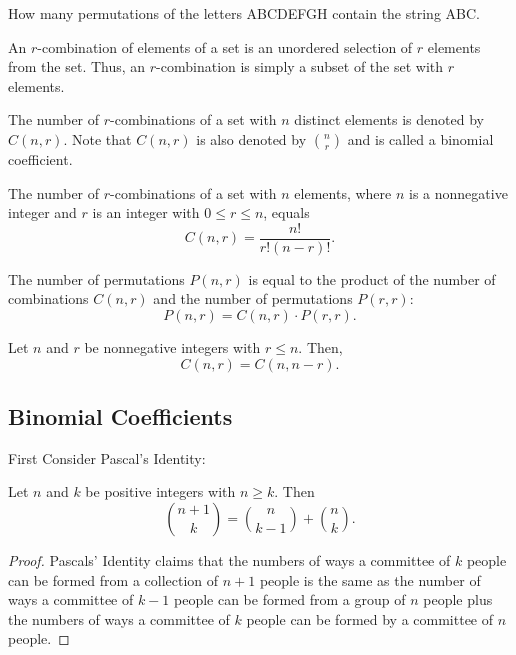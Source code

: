 \begin{exmp}

How many permutations of the letters ABCDEFGH contain the string ABC.
\vspace{3cm}
\end{exmp}
\begin{defn}
    An $r$-combination of elements of a set is an unordered selection of $r$ elements from the set. Thus, an $r$-combination is simply a subset of the set with $r$ elements.
\end{defn}
\begin{defn}
    The number of $r$-combinations of a set with $n$ distinct elements is denoted by $C(n, r)$. Note that $C(n, r)$ is also denoted by $\binom{n}{r}$ and is called a binomial coefficient.
\end{defn}
\begin{thm}
    The number of $r$-combinations of a set with $n$ elements, where $n$ is a nonnegative integer and $r$ is an integer with $0 \leq r \leq n$, equals
    \[
    C(n, r) = \frac{n!}{r! (n - r)!}.
    \]
\end{thm}
\begin{exmp}
    The number of permutations $P(n, r)$ is equal to the product of the number of combinations $C(n, r)$ and the number of permutations $P(r, r)$:
    \[
    P(n, r) = C(n, r) \cdot P(r, r).
    \]
    \vspace{3cm}
\end{exmp}
\begin{thm}

    Let $n$ and $r$ be nonnegative integers with $r \leq n$. Then, 
    \[
    C(n, r) = C(n, n - r).
    \]
    \vspace{3cm}
\end{thm}
\subsection{Binomial Coefficients}

First Consider Pascal's Identity:
\begin{thm}
    Let \(n\) and \(k\) be positive integers with \(n \geq k\). Then
    \[
    \binom{n+1}{k} = \binom{n}{k-1} + \binom{n}{k}.
    \]
\begin{proof}
Pascals' Identity claims that the numbers of ways a committee of $k$ people can be formed from a collection of $n+1$ people is the same as the number of ways a committee of $k-1$ people can be formed from a group of $n$ people plus the numbers of ways a committee of $k$ people can be formed by a committee of $n$ people.
\end{proof}
\end{thm}

